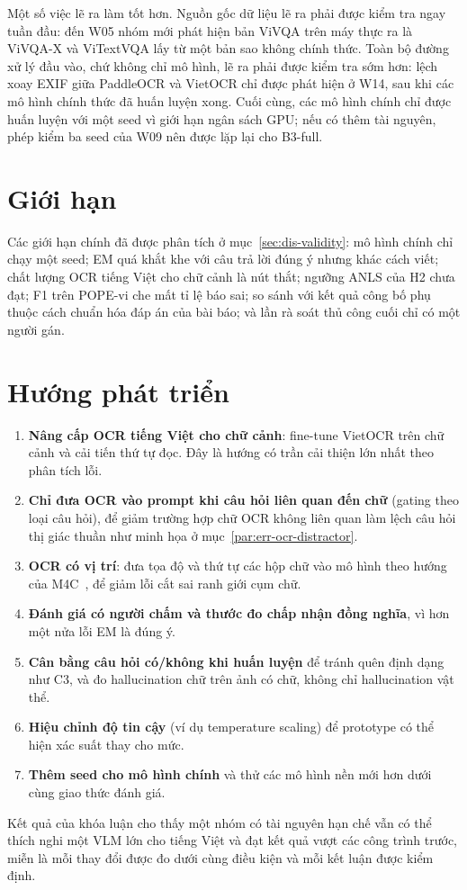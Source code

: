 Một số việc lẽ ra làm tốt hơn. Nguồn gốc dữ liệu lẽ ra phải được kiểm tra ngay tuần đầu: đến
W05 nhóm mới phát hiện bản ViVQA trên máy thực ra là ViVQA-X và ViTextVQA lấy từ một bản sao
không chính thức. Toàn bộ đường xử lý đầu vào, chứ không chỉ mô hình, lẽ ra phải được kiểm tra
sớm hơn: lệch xoay EXIF giữa PaddleOCR và VietOCR chỉ được phát hiện ở W14, sau khi các mô
hình chính thức đã huấn luyện xong. Cuối cùng, các mô hình chính chỉ được huấn luyện với một
seed vì giới hạn ngân sách GPU; nếu có thêm tài nguyên, phép kiểm ba seed của W09 nên được lặp
lại cho B3-full.

\section{Giới hạn}
\label{sec:con-limits}

Các giới hạn chính đã được phân tích ở mục~\ref{sec:dis-validity}: mô hình chính
chỉ chạy một seed; EM quá khắt khe với câu trả lời đúng ý nhưng khác cách viết;
chất lượng OCR tiếng Việt cho chữ cảnh là nút thắt; ngưỡng ANLS của H2 chưa đạt;
F1 trên POPE-vi che mất tỉ lệ báo sai; so sánh với kết quả công bố phụ thuộc cách
chuẩn hóa đáp án của bài báo; và lần rà soát thủ công cuối chỉ có một người gán.

\section{Hướng phát triển}
\label{sec:con-future}

\begin{enumerate}
  \item \textbf{Nâng cấp OCR tiếng Việt cho chữ cảnh}: fine-tune VietOCR trên chữ
  cảnh và cải tiến thứ tự đọc. Đây là hướng có trần cải thiện lớn nhất theo phân
  tích lỗi.
  \item \textbf{Chỉ đưa OCR vào prompt khi câu hỏi liên quan đến chữ} (gating theo
  loại câu hỏi), để giảm trường hợp chữ OCR không liên quan làm lệch câu hỏi thị
  giác thuần như minh họa ở mục~\ref{par:err-ocr-distractor}.
  \item \textbf{OCR có vị trí}: đưa tọa độ và thứ tự các hộp chữ vào mô hình theo
  hướng của M4C~\cite{hu2020m4c}, để giảm lỗi cắt sai ranh giới cụm chữ.
  \item \textbf{Đánh giá có người chấm và thước đo chấp nhận đồng nghĩa}, vì hơn
  một nửa lỗi EM là đúng ý.
  \item \textbf{Cân bằng câu hỏi có/không khi huấn luyện} để tránh quên định dạng
  như C3, và đo hallucination chữ trên ảnh có chữ, không chỉ hallucination vật thể.
  \item \textbf{Hiệu chỉnh độ tin cậy} (ví dụ temperature scaling) để prototype có
  thể hiện xác suất thay cho mức.
  \item \textbf{Thêm seed cho mô hình chính} và thử các mô hình nền mới hơn dưới
  cùng giao thức đánh giá.
\end{enumerate}

Kết quả của khóa luận cho thấy một nhóm có tài nguyên hạn chế vẫn có thể thích
nghi một VLM lớn cho tiếng Việt và đạt kết quả vượt các công trình trước, miễn là
mỗi thay đổi được đo dưới cùng điều kiện và mỗi kết luận được kiểm định.
